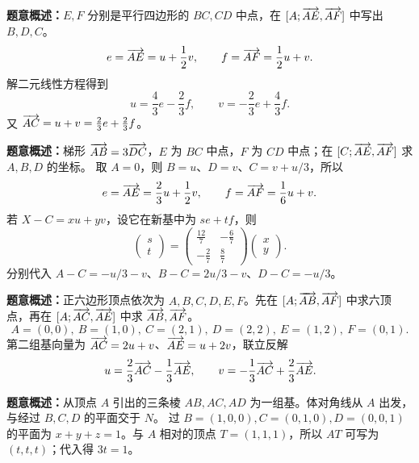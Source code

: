 \textbf{题意概述：}$E,F$ 分别是平行四边形的 $BC,CD$ 中点，在 $[A;\overrightarrow{AE},\overrightarrow{AF}]$ 中写出 $B,D,C$。
\[
e=\overrightarrow{AE}=u+\frac12v,\qquad f=\overrightarrow{AF}=\frac12u+v.
\]
解二元线性方程得到
\[
u=\frac43e-\frac23f,\qquad v=-\frac23e+\frac43f.
\]
又 $\overrightarrow{AC}=u+v=\tfrac23e+\tfrac23f$。

\textbf{题意概述：}梯形 $\overrightarrow{AB}=3\overrightarrow{DC}$，$E$ 为 $BC$ 中点，$F$ 为 $CD$ 中点；在 $[C;\overrightarrow{AE},\overrightarrow{AF}]$ 求 $A,B,D$ 的坐标。
取 $A=0$，则 $B=u$、$D=v$、$C=v+u/3$，所以
\[
e=\overrightarrow{AE}=\frac23u+\frac12v,\qquad
f=\overrightarrow{AF}=\frac16u+v.
\]
若 $X-C=xu+yv$，设它在新基中为 $se+tf$，则
\[
\begin{pmatrix}s\\t\end{pmatrix}
=\begin{pmatrix}\tfrac{12}{7}&-\tfrac67\\-\tfrac27&\tfrac87\end{pmatrix}
\begin{pmatrix}x\\y\end{pmatrix}.
\]
分别代入 $A-C=-u/3-v$、$B-C=2u/3-v$、$D-C=-u/3$。

\textbf{题意概述：}正六边形顶点依次为 $A,B,C,D,E,F$。先在 $[A;\overrightarrow{AB},\overrightarrow{AF}]$ 中求六顶点，再在 $[A;\overrightarrow{AC},\overrightarrow{AE}]$ 中求 $\overrightarrow{AB},\overrightarrow{AF}$。
\[
A=(0,0),\ B=(1,0),\ C=(2,1),\ D=(2,2),\ E=(1,2),\ F=(0,1).
\]
第二组基向量为 $\overrightarrow{AC}=2u+v$、$\overrightarrow{AE}=u+2v$，联立反解
\[
u=\frac23\overrightarrow{AC}-\frac13\overrightarrow{AE},\qquad
v=-\frac13\overrightarrow{AC}+\frac23\overrightarrow{AE}.
\]

\textbf{题意概述：}从顶点 $A$ 引出的三条棱 $AB,AC,AD$ 为一组基。体对角线从 $A$ 出发，与经过 $B,C,D$ 的平面交于 $N$。
过 $B=(1,0,0),C=(0,1,0),D=(0,0,1)$ 的平面为 $x+y+z=1$。与 $A$ 相对的顶点 $T=(1,1,1)$，所以 $AT$ 可写为 $(t,t,t)$；代入得 $3t=1$。


